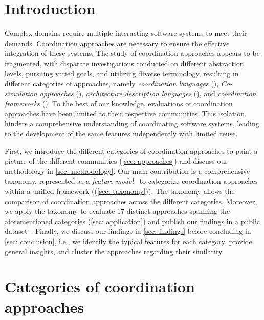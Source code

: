 \documentclass[runningheads]{llncs}
\begin{document}
\section{Introduction} \label{sec: introduction}
Complex domains require multiple interacting software systems to meet their demands. 
Coordination approaches are necessary to ensure the effective integration of these systems.
The study of coordination approaches appears to be fragmented, with disparate investigations conducted on different abstraction levels, pursuing varied goals, and utilizing diverse terminology, resulting in different categories of approaches, namely \textit{coordination languages} (\cite{papadopoulosCoordinationModelsLanguages1998}), \textit{Co-simulation approaches} (\cite{gomesCoSimulationSurvey2019}), \textit{architecture description languages} (\cite{clementsSurveyArchitectureDescription1996}), and \textit{coordination frameworks} (\cite{krauterBehavioralConsistencyMultimodeling2023,varalarsenBehavioralCoordinationOperator2015}).
To the best of our knowledge, evaluations of coordination approaches have been limited to their respective communities.
This isolation hinders a comprehensive understanding of coordinating software systems, leading to the development of the same features independently with limited reuse.

First, we introduce the different categories of coordination approaches to paint a picture of the different communities (\autoref{sec: approaches}) and discuss our methodology in \autoref{sec: methodology}.
Our main contribution is a comprehensive taxonomy, represented as a \textit{feature model}~\cite{kangFeatureOrientedDomainAnalysis1990} to categorize coordination approaches within a unified framework ((\autoref{sec: taxonomy})).
The taxonomy allows the comparison of coordination approaches across the different categories.
Moreover, we apply the taxonomy to evaluate 17 distinct approaches spanning the aforementioned categories (\autoref{sec: application}) and publish our findings in a public dataset~\cite{krauterCoordination2024Artifacts2024}.
Finally, we discuss our findings in \autoref{sec: findings} before concluding in \autoref{sec: conclusion}, i.e., we identify the typical features for each category, provide general insights, and cluster the approaches regarding their similarity.

\section{Categories of coordination approaches} \label{sec: approaches}
\end{document}
